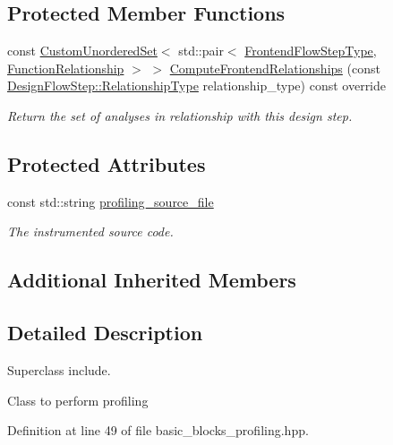 \subsection*{Protected Member Functions}
\begin{DoxyCompactItemize}
\item 
const \hyperlink{classCustomUnorderedSet}{Custom\+Unordered\+Set}$<$ std\+::pair$<$ \hyperlink{frontend__flow__step_8hpp_afeb3716c693d2b2e4ed3e6d04c3b63bb}{Frontend\+Flow\+Step\+Type}, \hyperlink{classFrontendFlowStep_af7cf30f2023e5b99e637dc2058289ab0}{Function\+Relationship} $>$ $>$ \hyperlink{classBasicBlocksProfiling_a8d93b5e29d4c675309f15bfcfdbb3ce4}{Compute\+Frontend\+Relationships} (const \hyperlink{classDesignFlowStep_a723a3baf19ff2ceb77bc13e099d0b1b7}{Design\+Flow\+Step\+::\+Relationship\+Type} relationship\+\_\+type) const override
\begin{DoxyCompactList}\small\item\em Return the set of analyses in relationship with this design step. \end{DoxyCompactList}\end{DoxyCompactItemize}
\subsection*{Protected Attributes}
\begin{DoxyCompactItemize}
\item 
const std\+::string \hyperlink{classBasicBlocksProfiling_a0b68176254963c56ee768ef7ace7f185}{profiling\+\_\+source\+\_\+file}
\begin{DoxyCompactList}\small\item\em The instrumented source code. \end{DoxyCompactList}\end{DoxyCompactItemize}
\subsection*{Additional Inherited Members}


\subsection{Detailed Description}
Superclass include. 

Class to perform profiling 

Definition at line 49 of file basic\+\_\+blocks\+\_\+profiling.\+hpp.



